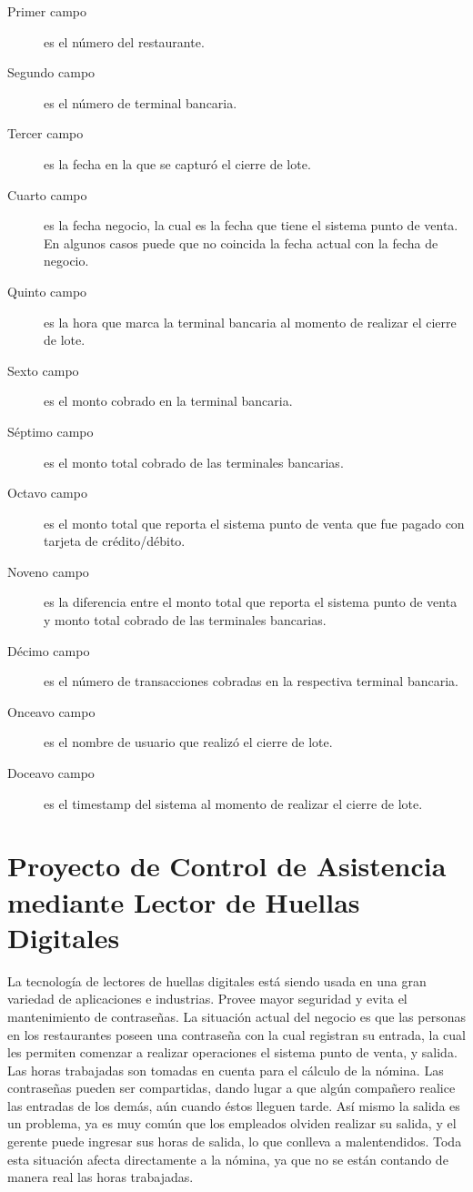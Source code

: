 \begin{description}
 \item[Primer campo] es el número del restaurante.
 \item[Segundo campo] es el número de terminal bancaria.
 \item[Tercer campo] es la fecha en la que se capturó el cierre de lote.
 \item[Cuarto campo] es la fecha negocio, la cual es la fecha que tiene el sistema punto de venta. En algunos casos puede que no coincida la fecha actual con la fecha de negocio.
 \item[Quinto campo] es la hora que marca la terminal bancaria al momento de realizar el cierre de lote.
 \item[Sexto campo] es el monto cobrado en la terminal bancaria.
 \item[Séptimo campo] es el monto total cobrado de las terminales bancarias.
 \item[Octavo campo] es el monto total que reporta el sistema punto de venta que fue pagado con tarjeta de crédito/débito.
 \item[Noveno campo] es la diferencia entre el monto total que reporta el sistema punto de venta y monto total cobrado de las terminales bancarias.
 \item[Décimo campo] es el número de transacciones cobradas en la respectiva terminal bancaria.
 \item[Onceavo campo] es el nombre de usuario que realizó el cierre de lote.
 \item[Doceavo campo] es el timestamp del sistema al momento de realizar el cierre de lote.
\end{description}


\section{Proyecto de Control de Asistencia mediante Lector de Huellas Digitales}
\label{sec:fingerprint}

La tecnología de lectores de huellas digitales está siendo usada en una gran variedad de aplicaciones e industrias. Provee mayor seguridad y evita el mantenimiento de contraseñas. La situación actual del negocio es que las personas en los restaurantes poseen una contraseña con la cual registran su entrada, la cual les permiten comenzar a realizar operaciones el sistema punto de venta,  y salida. Las horas trabajadas son tomadas en cuenta para el cálculo de la nómina. Las contraseñas pueden ser compartidas, dando lugar a que algún compañero realice las entradas de los demás, aún cuando éstos lleguen tarde. Así mismo la salida es un problema, ya es muy común que los empleados olviden realizar su salida, y el gerente puede ingresar sus horas de salida, lo que conlleva a malentendidos. Toda esta situación afecta directamente a la nómina, ya que no se están contando de manera real las horas trabajadas.

